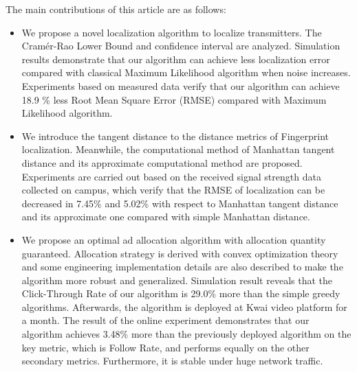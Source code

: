 \begin{eabstract}
   The main contributions of this article are as follows:
   \begin{itemize}
   	\item We propose a novel localization algorithm to localize transmitters. The Cram\'{e}r-Rao Lower Bound and confidence interval are analyzed. Simulation results demonstrate that our algorithm can achieve less localization error compared with classical Maximum Likelihood algorithm when noise increases. Experiments based on measured data verify that our algorithm can achieve 18.9 \% less Root Mean Square Error (RMSE) compared with Maximum Likelihood algorithm.
   	\item We introduce the tangent distance to the distance metrics of Fingerprint localization. Meanwhile, the computational method of Manhattan tangent distance and its approximate computational method are proposed. Experiments are carried out based on the received signal strength data collected on campus, which verify that the RMSE of localization can be decreased in 7.45\% and 5.02\% with respect to Manhattan tangent distance and its approximate one compared with simple Manhattan distance.
   	\item We propose an optimal ad allocation algorithm with allocation quantity guaranteed. Allocation strategy is derived with convex optimization theory and some engineering implementation details are also described to make the algorithm more robust and generalized. Simulation result reveals that the Click-Through Rate of our algorithm is 29.0\% more than the simple greedy algorithms. Afterwards, the algorithm is deployed at Kwai video platform for a month. The result of the online experiment demonstrates that our algorithm achieves 3.48\% more than the previously deployed algorithm on the  key metric, which is Follow Rate, and performs equally on the other secondary metrics. Furthermore, it is stable under huge network traffic. 
   \end{itemize}
   
\end{eabstract}

